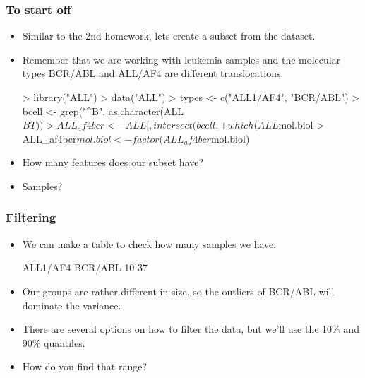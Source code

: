 \begin{frame}
  \frametitle{To start off}
  \begin{itemize}
  \item Similar to the 2nd homework, lets create a subset from the  dataset.
  \item Remember that we are working with leukemia samples and the molecular types BCR/ABL and ALL/AF4 are different translocations.
\begin{Schunk}
\begin{Sinput}
> library("ALL")
> data("ALL")
> types <- c("ALL1/AF4", "BCR/ABL")
> bcell <- grep("^B", as.character(ALL$BT))
> ALL_af4bcr <- ALL[, intersect(bcell, 
+     which(ALL$mol.biol %
> ALL_af4bcr$mol.biol <- factor(ALL_af4bcr$mol.biol)
\end{Sinput}
\end{Schunk}
  \item How many features does our subset have?
  \item Samples?
  \end{itemize}
\end{frame}

\begin{frame}
  \frametitle{Filtering}
  \begin{itemize}
  \item We can make a table to check how many samples we have:
\begin{Schunk}
\begin{Soutput}
ALL1/AF4  BCR/ABL 
      10       37 
\end{Soutput}
\end{Schunk}
  \item Our groups are rather different in size, so the outliers of BCR/ABL will dominate the variance.
  \item There are several options on how to filter the data, but we'll use the 10\% and 90\% quantiles.
  \item How do you find that range?
  \end{itemize}
\end{frame}

